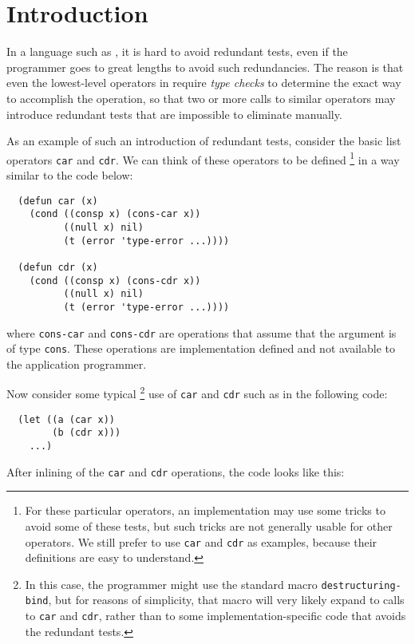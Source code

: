 \section{Introduction}

In a language such as \commonlisp{}, it is hard to avoid redundant
tests, even if the programmer goes to great lengths to avoid such
redundancies.  The reason is that even the lowest-level operators in
\commonlisp{} require \emph{type checks} to determine the exact way to
accomplish the operation, so that two or more calls to similar
operators may introduce redundant tests that are impossible to
eliminate manually.

As an example of such an introduction of redundant tests, consider the
basic list operators \texttt{car} and \texttt{cdr}.  We can think of
these operators to be defined%
\footnote{For these particular operators, an implementation may use
  some tricks to avoid some of these tests, but such tricks are not
  generally usable for other operators.  We still prefer to use
  \texttt{car} and \texttt{cdr} as examples, because their definitions
  are easy to understand.}
in a way similar to the code below:

\begin{verbatim}
  (defun car (x)
    (cond ((consp x) (cons-car x))
          ((null x) nil)
          (t (error 'type-error ...))))

  (defun cdr (x)
    (cond ((consp x) (cons-cdr x))
          ((null x) nil)
          (t (error 'type-error ...))))
\end{verbatim}

\noindent
where \texttt{cons-car} and \texttt{cons-cdr} are operations that
assume that the argument is of type \texttt{cons}.  These operations
are implementation defined and not available to the application
programmer.

Now consider some typical%
\footnote{In this case, the programmer might use the standard macro
  \texttt{destructuring-bind}, but for reasons of simplicity, that
  macro will very likely expand to calls to \texttt{car} and
  \texttt{cdr}, rather than to some implementation-specific code that
  avoids the redundant tests.}
use of \texttt{car} and \texttt{cdr} such as
in the following code:

\begin{verbatim}
  (let ((a (car x))
        (b (cdr x)))
    ...)
\end{verbatim}

After inlining of the \texttt{car} and \texttt{cdr} operations, the
code looks like this:

